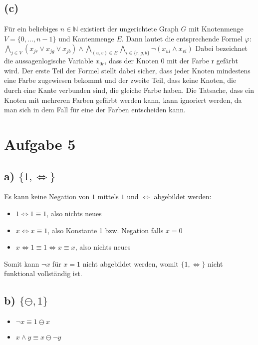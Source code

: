 \documentclass[11pt, a4paper]{article}
\begin{document}
\subsection*{(c)}
Für ein beliebiges $n \in \mathbb{N}$ existiert der ungerichtete Graph $G$ mit Knotenmenge $V=\{0,...,n-1\}$ und Kantenmenge $E$. Dann lautet die entsprechende Formel $\varphi$:\newline
$\bigwedge\limits_{j\in V}(x_{jr}\vee x_{jg}\vee x_{jb}) \wedge \bigwedge\limits_{(u,v)\in E} \bigwedge\limits_{i\in \{r,g,b\}} \neg (x_{ui}\wedge x_{vi})$\newline
Dabei bezeichnet die aussagenlogische Variable $x_{0r}$, dass der Knoten 0 mit der Farbe r gefärbt wird. Der erste Teil der Formel stellt dabei sicher, dass jeder Knoten mindestens eine Farbe zugewiesen bekommt und der zweite Teil, dass keine Knoten, die durch eine Kante verbunden sind, die gleiche Farbe haben. Die Tatsache, dass ein Knoten mit mehreren Farben gefärbt werden kann, kann ignoriert werden, da man sich in dem Fall für eine der Farben entscheiden kann.



\section*{Aufgabe 5}

\subsection*{a) $\{1,\iff\}$}

Es kann keine Negation von $1$ mittels $1$ und $\iff$ abgebildet werden:
\begin{itemize}
    \item $1 \iff 1 \equiv 1$, also nichts neues
    \item $x \iff x \equiv 1$, also Konstante 1 bzw. Negation falls $x = 0$
    \item $x \iff 1 \equiv 1 \iff x \equiv x$, also nichts neues
\end{itemize}

Somit kann $\neg x$ für $x = 1$ nicht abgebildet werden, womit $\{1,\iff\}$ nicht funktional vollständig ist.

\subsection*{b) $\{\ominus,1\}$}
\begin{itemize}
    \item $\neg x \equiv 1 \ominus x$
    \item $x \wedge y \equiv x \ominus \neg y$
\end{itemize}
\end{document}
